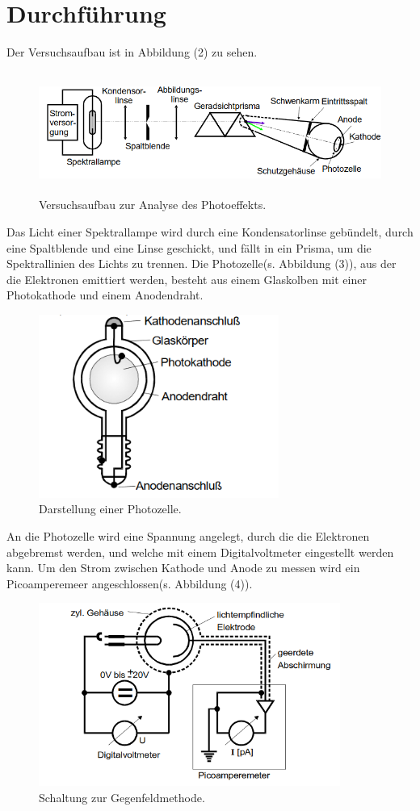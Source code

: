 \section{Durchführung}
\label{sec:Durchführung}

Der Versuchsaufbau ist in Abbildung (2) zu sehen.
\begin{figure}[H]
  \centering
  \includegraphics[height=4cm]{aufbau.PNG}
  \caption{Versuchsaufbau zur Analyse des Photoeffekts. \cite{kent}}
\end{figure}
Das Licht einer Spektrallampe wird durch eine Kondensatorlinse gebündelt, durch eine Spaltblende und eine Linse geschickt, und fällt in ein Prisma, um die Spektrallinien des Lichts zu trennen.
Die Photozelle(s. Abbildung (3)), aus der die Elektronen emittiert werden, besteht aus einem Glaskolben mit einer Photokathode und einem Anodendraht. 
\begin{figure}[H]
  \centering
  \includegraphics[height=6cm]{photo.PNG}
  \caption{Darstellung einer Photozelle. \cite{kent}}
\end{figure}
An die Photozelle wird eine Spannung angelegt, durch die die Elektronen abgebremst werden, und welche mit einem Digitalvoltmeter eingestellt werden kann. Um den Strom zwischen Kathode und Anode zu messen wird ein Picoamperemeer angeschlossen(s. Abbildung (4)). 
\begin{figure}[H]
  \centering
  \includegraphics[height=6cm]{schaltung.PNG}
  \caption{Schaltung zur Gegenfeldmethode. \cite{kent}}
\end{figure}
